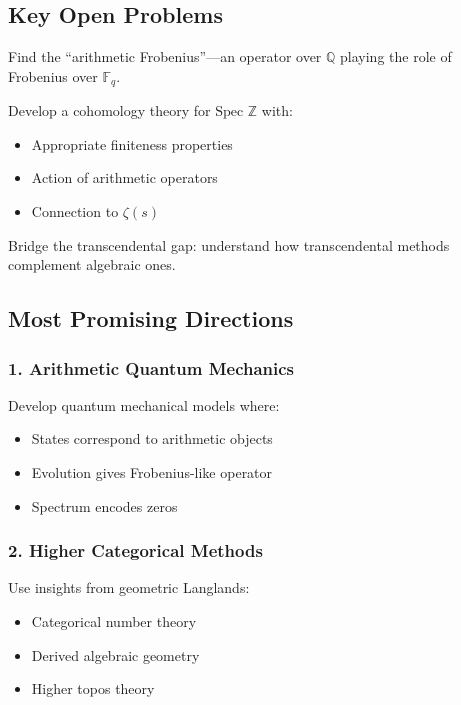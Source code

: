\subsection{Key Open Problems}

\begin{problem}
Find the ``arithmetic Frobenius''—an operator over $\mathbb{Q}$ playing the role of Frobenius over $\mathbb{F}_q$.
\end{problem}

\begin{problem}
Develop a cohomology theory for $\text{Spec } \mathbb{Z}$ with:
\begin{itemize}
\item Appropriate finiteness properties
\item Action of arithmetic operators
\item Connection to $\zeta(s)$
\end{itemize}
\end{problem}

\begin{problem}
Bridge the transcendental gap: understand how transcendental methods complement algebraic ones.
\end{problem}

\subsection{Most Promising Directions}

\subsubsection{1. Arithmetic Quantum Mechanics}

Develop quantum mechanical models where:
\begin{itemize}
\item States correspond to arithmetic objects
\item Evolution gives Frobenius-like operator
\item Spectrum encodes zeros
\end{itemize}

\subsubsection{2. Higher Categorical Methods}

Use insights from geometric Langlands:
\begin{itemize}
\item Categorical number theory
\item Derived algebraic geometry
\item Higher topos theory
\end{itemize}

